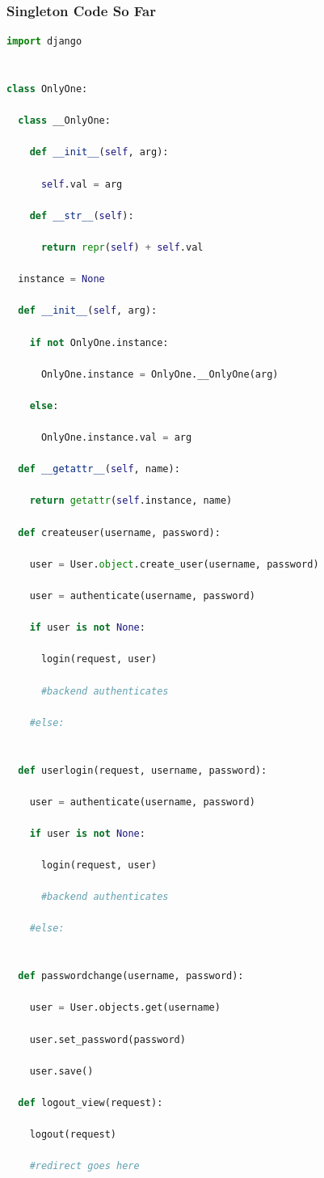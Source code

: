 ﻿\documentclass{article}
\begin{document}
\subsubsection{Singleton Code So Far}
\begin{lstlisting}[language = Python]
import django


class OnlyOne:

  class __OnlyOne:

    def __init__(self, arg):

      self.val = arg

    def __str__(self):

      return repr(self) + self.val

  instance = None

  def __init__(self, arg):

    if not OnlyOne.instance:

      OnlyOne.instance = OnlyOne.__OnlyOne(arg)

    else:

      OnlyOne.instance.val = arg

  def __getattr__(self, name):

    return getattr(self.instance, name)

  def createuser(username, password):

    user = User.object.create_user(username, password)

    user = authenticate(username, password)

    if user is not None:

      login(request, user)

      #backend authenticates

    #else:


  def userlogin(request, username, password):

    user = authenticate(username, password)

    if user is not None:

      login(request, user)

      #backend authenticates

    #else:


  def passwordchange(username, password):

    user = User.objects.get(username)

    user.set_password(password)

    user.save()

  def logout_view(request):

    logout(request)

    #redirect goes here


\end{lstlisting}
\end{document}
